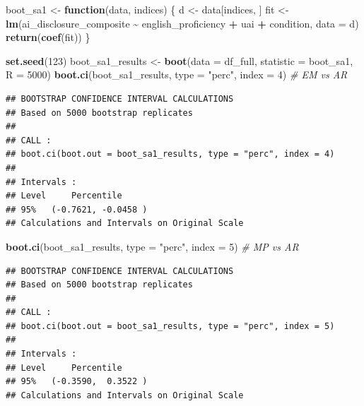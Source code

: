 \documentclass[
]{article}
\newenvironment{Shaded}{\begin{snugshade}}{\end{snugshade}}
\newcommand{\AttributeTok}[1]{\textcolor[rgb]{0.13,0.29,0.53}{#1}}
\newcommand{\CommentTok}[1]{\textcolor[rgb]{0.56,0.35,0.01}{\textit{#1}}}
\newcommand{\ControlFlowTok}[1]{\textcolor[rgb]{0.13,0.29,0.53}{\textbf{#1}}}
\newcommand{\DecValTok}[1]{\textcolor[rgb]{0.00,0.00,0.81}{#1}}
\newcommand{\FunctionTok}[1]{\textcolor[rgb]{0.13,0.29,0.53}{\textbf{#1}}}
\newcommand{\NormalTok}[1]{#1}
\newcommand{\OtherTok}[1]{\textcolor[rgb]{0.56,0.35,0.01}{#1}}
\newcommand{\SpecialCharTok}[1]{\textcolor[rgb]{0.81,0.36,0.00}{\textbf{#1}}}
\newcommand{\StringTok}[1]{\textcolor[rgb]{0.31,0.60,0.02}{#1}}
\begin{document}
\begin{Shaded}
\begin{Highlighting}[]
\NormalTok{boot\_sa1 }\OtherTok{\textless{}{-}} \ControlFlowTok{function}\NormalTok{(data, indices) \{}
\NormalTok{  d }\OtherTok{\textless{}{-}}\NormalTok{ data[indices, ]}
\NormalTok{  fit }\OtherTok{\textless{}{-}} \FunctionTok{lm}\NormalTok{(ai\_disclosure\_composite }\SpecialCharTok{\textasciitilde{}}\NormalTok{ english\_proficiency }\SpecialCharTok{+}\NormalTok{ uai }\SpecialCharTok{+}\NormalTok{ condition, }\AttributeTok{data =}\NormalTok{ d)}
  \FunctionTok{return}\NormalTok{(}\FunctionTok{coef}\NormalTok{(fit))}
\NormalTok{\}}

\FunctionTok{set.seed}\NormalTok{(}\DecValTok{123}\NormalTok{)}
\NormalTok{boot\_sa1\_results }\OtherTok{\textless{}{-}} \FunctionTok{boot}\NormalTok{(}\AttributeTok{data =}\NormalTok{ df\_full, }\AttributeTok{statistic =}\NormalTok{ boot\_sa1, }\AttributeTok{R =} \DecValTok{5000}\NormalTok{)}
\FunctionTok{boot.ci}\NormalTok{(boot\_sa1\_results, }\AttributeTok{type =} \StringTok{"perc"}\NormalTok{, }\AttributeTok{index =} \DecValTok{4}\NormalTok{) }\CommentTok{\# EM vs AR}
\end{Highlighting}
\end{Shaded}

\begin{verbatim}
## BOOTSTRAP CONFIDENCE INTERVAL CALCULATIONS
## Based on 5000 bootstrap replicates
## 
## CALL : 
## boot.ci(boot.out = boot_sa1_results, type = "perc", index = 4)
## 
## Intervals : 
## Level     Percentile     
## 95%   (-0.7621, -0.0458 )  
## Calculations and Intervals on Original Scale
\end{verbatim}

\begin{Shaded}
\begin{Highlighting}[]
\FunctionTok{boot.ci}\NormalTok{(boot\_sa1\_results, }\AttributeTok{type =} \StringTok{"perc"}\NormalTok{, }\AttributeTok{index =} \DecValTok{5}\NormalTok{) }\CommentTok{\# MP vs AR}
\end{Highlighting}
\end{Shaded}

\begin{verbatim}
## BOOTSTRAP CONFIDENCE INTERVAL CALCULATIONS
## Based on 5000 bootstrap replicates
## 
## CALL : 
## boot.ci(boot.out = boot_sa1_results, type = "perc", index = 5)
## 
## Intervals : 
## Level     Percentile     
## 95%   (-0.3590,  0.3522 )  
## Calculations and Intervals on Original Scale
\end{verbatim}
\end{document}
